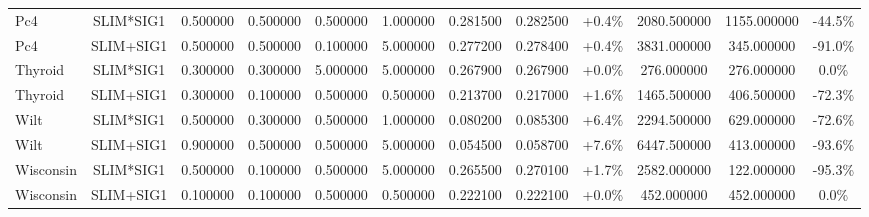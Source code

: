\begin{table}[H]
\begin{tabular}{lccccccccccc}
Pc4 & SLIM*SIG1 & 0.500000 & 0.500000 & 0.500000 & 1.000000 & 0.281500 & 0.282500 & +0.4\% & 2080.500000 & 1155.000000 & -44.5\% \\
Pc4 & SLIM+SIG1 & 0.500000 & 0.500000 & 0.100000 & 5.000000 & 0.277200 & 0.278400 & +0.4\% & 3831.000000 & 345.000000 & -91.0\% \\
Thyroid & SLIM*SIG1 & 0.300000 & 0.300000 & 5.000000 & 5.000000 & 0.267900 & 0.267900 & +0.0\% & 276.000000 & 276.000000 & 0.0\% \\
Thyroid & SLIM+SIG1 & 0.300000 & 0.100000 & 0.500000 & 0.500000 & 0.213700 & 0.217000 & +1.6\% & 1465.500000 & 406.500000 & -72.3\% \\
Wilt & SLIM*SIG1 & 0.500000 & 0.300000 & 0.500000 & 1.000000 & 0.080200 & 0.085300 & +6.4\% & 2294.500000 & 629.000000 & -72.6\% \\
Wilt & SLIM+SIG1 & 0.900000 & 0.500000 & 0.500000 & 5.000000 & 0.054500 & 0.058700 & +7.6\% & 6447.500000 & 413.000000 & -93.6\% \\
Wisconsin & SLIM*SIG1 & 0.500000 & 0.100000 & 0.500000 & 5.000000 & 0.265500 & 0.270100 & +1.7\% & 2582.000000 & 122.000000 & -95.3\% \\
Wisconsin & SLIM+SIG1 & 0.100000 & 0.100000 & 0.500000 & 0.500000 & 0.222100 & 0.222100 & +0.0\% & 452.000000 & 452.000000 & 0.0\% \\
\bottomrule
\end{tabular}

        
    \end{table}
    